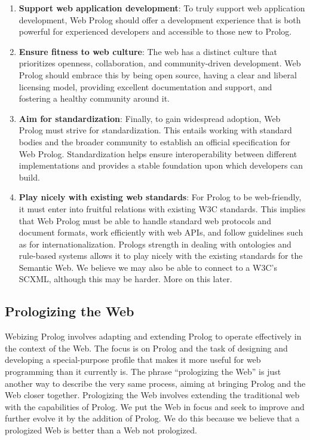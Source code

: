 \begin{enumerate}
\item
  \textbf{Support web application development}: To truly support web
  application development, Web Prolog should offer a
  development experience that is both powerful for experienced
  developers and accessible to those new to Prolog.
\item
  \textbf{Ensure fitness to web culture}: The web has a distinct culture
  that prioritizes openness, collaboration, and community-driven
  development. Web Prolog should embrace this by being open source,
  having a clear and liberal licensing model, providing excellent
  documentation and support, and fostering a healthy community around it. 
\item
  \textbf{Aim for standardization}: Finally, to gain widespread
  adoption, Web Prolog must strive for standardization. This entails
  working with standard bodies and the broader community to establish an
  official specification for Web Prolog. Standardization helps ensure
  interoperability between different implementations and provides a
  stable foundation upon which developers can build.
\item
  \textbf{Play nicely with existing web standards}: For Prolog to be web-friendly, it must enter into fruitful relations with existing W3C standards. This implies that Web Prolog must be able to handle standard web protocols and document formats, work efficiently with web APIs, and follow guidelines such as for internationalization. Prolog\textquotesingle s strength in dealing with ontologies and rule-based systems allows it to play nicely with the existing standards for the Semantic Web. We believe we may also be able to connect to a W3C's SCXML, although this may be harder. More on this later.
\end{enumerate}

\subsection{Prologizing the Web}

\noindent Webizing Prolog involves adapting and extending Prolog to operate effectively in the context of the Web. The focus is on Prolog and the task of designing and developing a special-purpose profile that makes it more useful for web programming than it currently is. The phrase ``prologizing the Web'' is just another way to describe the very same process, aiming at bringing Prolog and the Web closer together. Prologizing the Web involves extending the traditional web with the capabilities of Prolog. We put the Web in focus and seek to improve and further evolve it by the addition of Prolog. We do this because we believe that a prologized Web is better than a Web not prologized.  

